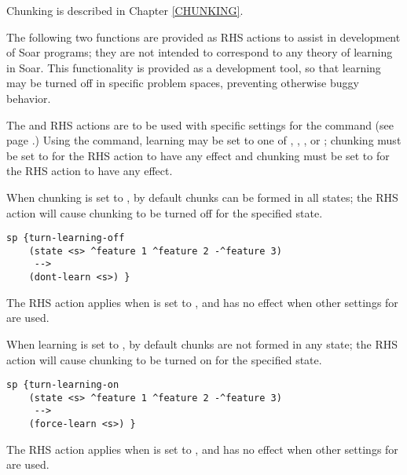 Chunking is described in Chapter \ref{CHUNKING}.

The following two functions are provided as RHS actions to assist in
development of Soar programs; they are not intended to correspond to any
theory of learning in Soar. This functionality is provided as a development 
tool, so that learning may be turned off in specific problem spaces,
preventing otherwise buggy behavior.

The  and  RHS actions are to be used with
specific settings for the  command (see page \pageref{chunk}.)
Using the  command, learning may be set to one of ,
, , or ; chunking must be set to
 for the  RHS action to have any effect and
chunking must be set to  for the  RHS action
to have any effect.

\begin{description}
\item [\soarb{dont-learn} --- ] When chunking is set to ,
        by default chunks can be formed in all states; the 
        RHS action will cause chunking to be turned off for the specified
        state.

\begin{verbatim}
sp {turn-learning-off
    (state <s> ^feature 1 ^feature 2 -^feature 3)
     -->
    (dont-learn <s>) }
\end{verbatim}

        The  RHS action applies when  is 
	    set to , and has no effect when other settings for
         are used.


\item [\soarb{force-learn} --- ] When learning is set to ,
        by default chunks are not formed in any state; the 
        RHS action will cause chunking to be turned on for the specified
        state.

\begin{verbatim}
sp {turn-learning-on
    (state <s> ^feature 1 ^feature 2 -^feature 3)
     -->
    (force-learn <s>) }
\end{verbatim}

        The  RHS action applies when 
	    is set to , and has no effect when other settings for
         are used.

\end{description}

